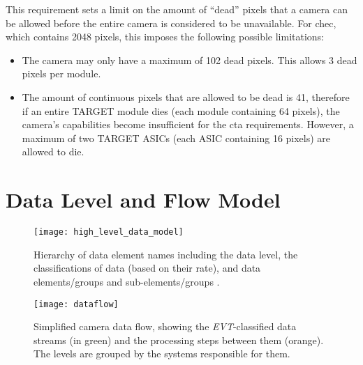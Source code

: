This requirement sets a limit on the amount of ``dead'' pixels that a camera can be allowed before the entire camera is considered to be unavailable. For \gls{chec}, which contains 2048 pixels, this imposes the following possible limitations:
\begin{itemize}
\item The camera may only have a maximum of 102 dead pixels. This allows 3 dead pixels per module.
\item The amount of continuous pixels that are allowed to be dead is 41, therefore if an entire TARGET module dies (each module containing 64 pixels), the camera's capabilities become insufficient for the \gls{cta} requirements. However, a maximum of two TARGET ASICs (each ASIC containing 16 pixels) are allowed to die.
\end{itemize}

\section{Data Level and Flow Model} \label{section:data_levels}

\begin{figure}[H]
 	\centering
  	\texttt{[image: high\_level\_data\_model]} 
	\caption[High-level data model hierarchy.]{Hierarchy of data element names including the data level, the classifications of data (based on their rate), and data elements/groups and sub-elements/groups \cite{Kosack2017}.}
	\label{fig:high_level_data_model}
\end{figure}

\begin{wrapfigure}[37]{r}{0.32\textwidth}
	\texttt{[image: dataflow]}
	\caption[Simplified camera data flow.]{Simplified camera data flow, showing the \textit{EVT}-classified data streams (in green) and the processing steps between them (orange). The levels are grouped by the systems responsible for them.}
	\label{fig:dataflow}
\end{wrapfigure}

